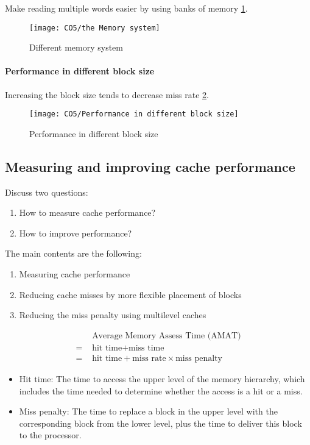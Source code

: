 Make reading multiple words easier by using banks of memory \ref{Different memory system}.

\begin{figure}[!htb]
    \centering
    \texttt{[image: CO5/the Memory system]}
    \caption{Different memory system}
    \label{Different memory system}
\end{figure}

\paragraph{Performance in different block size}
Increasing the block size tends to decrease miss rate \ref{Performance in different block size}.
\begin{figure}[!htb]
    \centering
    \texttt{[image: CO5/Performance in different block size]}
    \caption{Performance in different block size}
    \label{Performance in different block size}
\end{figure}

\subsection{Measuring and improving cache performance}
Discuss two questions:
\begin{enumerate}\small
    \item How to measure cache performance?
    \item How to improve performance?
\end{enumerate}

The main contents are the following:
\begin{enumerate}\small
    \item Measuring cache performance
    \item Reducing cache misses by more flexible placement of blocks
    \item Reducing the miss penalty using multilevel caches
\end{enumerate}
{\small
    \begin{align*}
        &\text{ Average Memory Assess Time (AMAT)}\\
        =& \text{ hit time} + \text{miss time}\\
        =& \text{ hit time} + \text{miss rate} \times \text{miss penalty}
    \end{align*}
}
\begin{itemize}\small
    \item Hit time: The time to access the upper level of the memory hierarchy, which includes the time needed to determine whether the access is a hit or a miss.
    \item Miss penalty: The time to replace a block in the upper level with the corresponding block from the lower level, plus the time to deliver this block to the processor.
\end{itemize}

